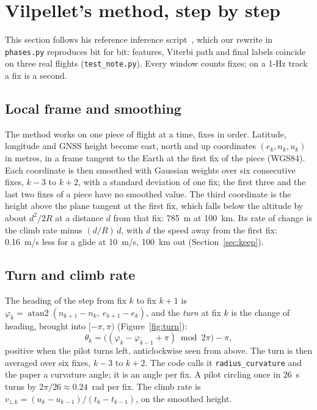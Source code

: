 \section{Vilpellet's method, step by step}\label{sec:method}

This section follows his reference inference script~\cite{vilpellet2025code}, which our rewrite
in \texttt{phases.py} reproduces bit for bit: features, Viterbi path and final labels coincide on
three real flights (\texttt{test\_note.py}). Every window counts fixes; on a 1-Hz track a fix is a
second.

\subsection{Local frame and smoothing}\label{sec:frame}

The method works on one piece of flight at a time, fixes in order. Latitude, longitude and GNSS
height become east, north and up coordinates $(e_k,n_k,u_k)$ in metres, in a frame tangent to the
Earth at the first fix of the piece (WGS84). Each coordinate is then smoothed with Gaussian
weights over six consecutive fixes, $k-3$ to $k+2$, with a standard deviation of one fix; the first
three and the last two fixes of a piece have no smoothed value. The third coordinate is the height
above the plane tangent at the first fix, which falls below the altitude by about $d^2/2R$ at a
distance $d$ from that fix: 785~m at 100~km. Its rate of change is the climb rate minus
$(d/R)\,\dot d$, with $\dot d$ the speed away from the first fix: 0.16~m/s less for a glide at
10~m/s, 100~km out (Section~\ref{sec:keep}).

\subsection{Turn and climb rate}\label{sec:turn}

The heading of the step from fix $k$ to fix $k+1$ is $\varphi_k=\operatorname{atan2}(n_{k+1}-n_k,\
e_{k+1}-e_k)$, and the \emph{turn} at fix $k$ is the change of heading, brought into $[-\pi,\pi)$
(Figure~\ref{fig:turn}):
\begin{equation}\label{eq:turn}
  \theta_k = \bigl((\varphi_k-\varphi_{k-1}+\pi) \bmod 2\pi\bigr)-\pi ,
\end{equation}
positive when the pilot turns left, anticlockwise seen from above. The turn is then averaged over
six fixes, $k-3$ to $k+2$. The code calls it \texttt{radius\_curvature} and the paper a curvature
angle; it is an angle per fix. A pilot circling once in 26~s turns by
$2\pi/26\approx0.24$~rad per fix. The climb rate is $v_{z,k}=(u_k-u_{k-1})/(t_k-t_{k-1})$, on the
smoothed height.

